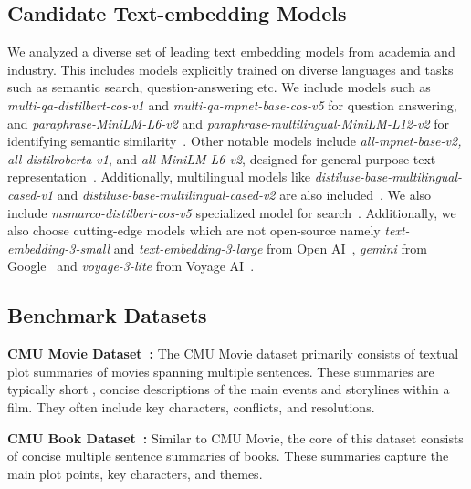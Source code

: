 \subsection{Candidate Text-embedding Models}
We analyzed a diverse set of leading text embedding models from academia and industry. This includes models explicitly trained on diverse languages and tasks such as semantic search, question-answering etc. We include models such as \textit{multi-qa-distilbert-cos-v1} and \textit{multi-qa-mpnet-base-cos-v5} for question answering, and \textit{paraphrase-MiniLM-L6-v2} and \textit{paraphrase-multilingual-MiniLM-L12-v2} for identifying semantic similarity~\citep{reimers2019sentence}. Other notable models include \textit{all-mpnet-base-v2, all-distilroberta-v1}, and \textit{all-MiniLM-L6-v2}, designed for general-purpose text representation~\citep{reimers2019sentence}. Additionally, multilingual models like \textit{distiluse-base-multilingual-cased-v1} and \textit{distiluse-base-multilingual-cased-v2 }are also included~\citep{reimers-2020-multilingual-sentence-bert}. We also include \textit{msmarco-distilbert-cos-v5} specialized model for search~\citep{reimers2019sentence}. Additionally, we also choose cutting-edge models which are not open-source namely \textit{text-embedding-3-small} and  \textit{text-embedding-3-large} from Open AI~\citep{OpenAI2024}, \textit{gemini} from Google~\citep{team2023gemini} and \textit{voyage-3-lite} from Voyage AI~\citep{VoyageAI2024}.




\subsection{Benchmark Datasets }
\label{benchmark:datasets}

    \textbf{CMU Movie Dataset~\citep{bamman2013learning}:} The CMU Movie dataset primarily consists of textual plot summaries of movies spanning multiple sentences. These summaries are typically short , concise descriptions of the main events and storylines within a film. They often include key characters, conflicts, and resolutions. 
    
  \textbf{CMU Book Dataset~\citep{bamman2013new}:} Similar to CMU Movie, the core of this dataset consists of concise multiple sentence summaries of books. These summaries  capture the main plot points, key characters, and themes.   

